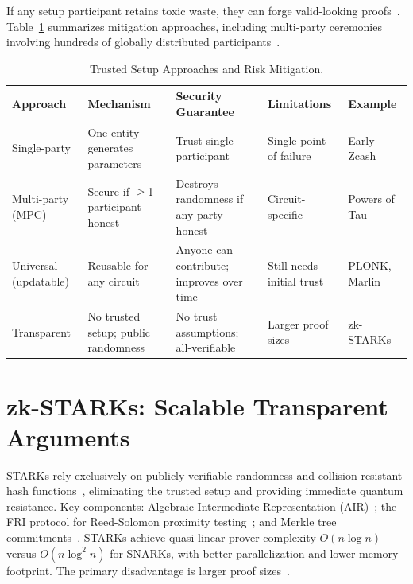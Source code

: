 \documentclass[sigconf,nonacm]{acmart}
\begin{document}
If any setup participant retains toxic waste, they can forge valid-looking
proofs~\cite{toxic_waste_2023}. Table~\ref{tab:trusted_setup} summarizes mitigation
approaches, including multi-party ceremonies involving hundreds of globally distributed
participants~\cite{zcash_ceremony_2024}.

\begin{table}[t]
\caption{Trusted Setup Approaches and Risk Mitigation.}
\label{tab:trusted_setup}
\small
\setlength{\tabcolsep}{5pt}
\begin{tabularx}{\textwidth}{@{}p{2.5cm}XXp{2.5cm}p{2.2cm}@{}}
\toprule
\textbf{Approach} & \textbf{Mechanism} & \textbf{Security Guarantee} &
\textbf{Limitations} & \textbf{Example} \\
\midrule
Single-party & One entity generates parameters & Trust single participant &
  Single point of failure & Early Zcash~\cite{zcash_original_2022} \\
Multi-party (MPC) & Secure if $\geq$1 participant honest &
  Destroys randomness if any party honest & Circuit-specific &
  Powers of Tau~\cite{powers_of_tau_2023} \\
Universal (updatable) & Reusable for any circuit &
  Anyone can contribute; improves over time & Still needs initial trust &
  PLONK, Marlin~\cite{plonk_2023} \\
Transparent & No trusted setup; public randomness &
  No trust assumptions; all-verifiable & Larger proof sizes &
  zk-STARKs~\cite{stark_transparent_2024} \\
\bottomrule
\end{tabularx}
\end{table}

\section{zk-STARKs: Scalable Transparent Arguments}
\label{sec:starks}

STARKs rely exclusively on publicly verifiable randomness and collision-resistant hash
functions~\cite{stark_foundations_2023,transparent_zkp_2024}, eliminating the trusted
setup and providing immediate quantum resistance. Key components: Algebraic Intermediate
Representation (AIR)~\cite{air_design_2023}; the FRI protocol for Reed-Solomon proximity
testing~\cite{fri_protocol_2023}; and Merkle tree
commitments~\cite{merkle_commitments_2024}. STARKs achieve quasi-linear prover
complexity $O(n\log n)$ versus $O(n\log^2 n)$ for SNARKs, with better parallelization
and lower memory footprint. The primary disadvantage is larger proof
sizes~\cite{proof_size_analysis_2024,stark_optimization_2025}.
\end{document}
